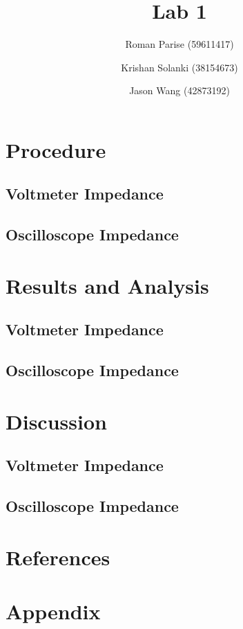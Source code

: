 \documentclass[a4paper,titlepage,10pt]{article}
\title{Lab 1}
\author{
Roman Parise (59611417) \and
Krishan Solanki (38154673) \and
Jason Wang (42873192)}
\begin{document}
\maketitle

\section{Procedure}
\subsection{Voltmeter Impedance}

\subsection{Oscilloscope Impedance}


\section{Results and Analysis}
\subsection{Voltmeter Impedance}
\subsection{Oscilloscope Impedance}


\section{Discussion}
\subsection{Voltmeter Impedance}
\subsection{Oscilloscope Impedance}


\section{References}

\section{Appendix}

\end{document}
